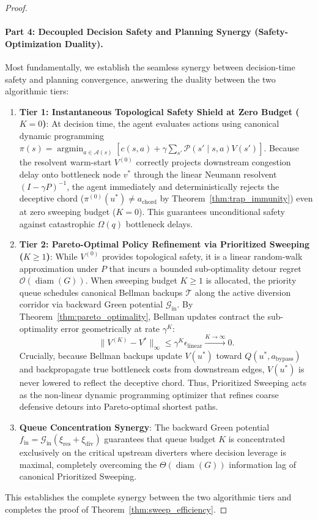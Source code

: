 \documentclass[11pt,a4paper]{article}
\begin{document}
\begin{proof}
\paragraph{Part 4: Decoupled Decision Safety and Planning Synergy (Safety-Optimization Duality).}
Most fundamentally, we establish the seamless synergy between decision-time safety and planning convergence, answering the duality between the two algorithmic tiers:
\begin{enumerate}
    \item \textbf{Tier 1: Instantaneous Topological Safety Shield at Zero Budget ($K = 0$)}: At decision time, the agent evaluates actions using canonical dynamic programming $\pi(s) = \operatorname{argmin}_{a \in \mathcal{A}(s)} [ c(s, a) + \gamma \sum_{s'} \mathcal{P}(s' \mid s, a) V(s') ]$. Because the resolvent warm-start $V^{(0)}$ correctly projects downstream congestion delay onto bottleneck node $v^*$ through the linear Neumann resolvent $(I - \gamma P)^{-1}$, the agent immediately and deterministically rejects the deceptive chord ($\pi^{(0)}(u^*) \ne a_{\text{chord}}$ by Theorem~\ref{thm:trap_immunity}) even at zero sweeping budget ($K = 0$). This guarantees unconditional safety against catastrophic $\Omega(q)$ bottleneck delays.
    \item \textbf{Tier 2: Pareto-Optimal Policy Refinement via Prioritized Sweeping ($K \ge 1$)}: While $V^{(0)}$ provides topological safety, it is a linear random-walk approximation under $P$ that incurs a bounded sub-optimality detour regret $\mathcal{O}(\operatorname{diam}(G))$. When sweeping budget $K \ge 1$ is allocated, the priority queue schedules canonical Bellman backups $\mathcal{T}$ along the active diversion corridor via backward Green potential $\mathcal{G}_{\text{in}}$. By Theorem~\ref{thm:pareto_optimality}, Bellman updates contract the sub-optimality error geometrically at rate $\gamma^K$:
    \begin{equation}
    \|V^{(K)} - V^*\|_\infty \le \gamma^K \epsilon_{\text{linear}} \xrightarrow{K \to \infty} 0.
    \end{equation}
    Crucially, because Bellman backups update $V(u^*)$ toward $Q(u^*, a_{\text{bypass}})$ and backpropagate true bottleneck costs from downstream edges, $V(u^*)$ is never lowered to reflect the deceptive chord. Thus, Prioritized Sweeping acts as the non-linear dynamic programming optimizer that refines coarse defensive detours into Pareto-optimal shortest paths.
    \item \textbf{Queue Concentration Synergy}: The backward Green potential $f_{\text{in}} = \mathcal{G}_{\text{in}} (\xi_{\text{res}} + \xi_{\text{div}})$ guarantees that queue budget $K$ is concentrated exclusively on the critical upstream diverters where decision leverage is maximal, completely overcoming the $\Theta(\operatorname{diam}(G))$ information lag of canonical Prioritized Sweeping.
\end{enumerate}
This establishes the complete synergy between the two algorithmic tiers and completes the proof of Theorem~\ref{thm:sweep_efficiency}.
\end{proof}
\end{document}
